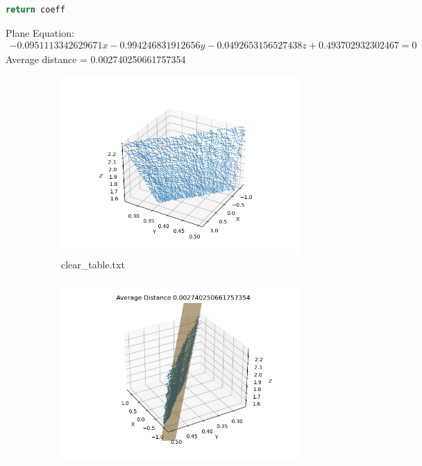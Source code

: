 \documentclass[conference,onecolumn]{IEEEtran}
\begin{document}
\begin{enumerate}[label=\arabic{enumi}.]
\begin{enumerate}
\begin{lstlisting}[language=Python]
      return coeff
                        \end{lstlisting}
                        Plane Equation:
                        \begin{align*}
                              -0.0951113342629671 x - 0.994246831912656 y - 0.0492653156527438 z + 0.493702932302467 = 0
                        \end{align*}
                        Average distance = 0.002740250661757354
                        \begin{figure}[H]
                              \centering
                              \begin{subfigure}{.49\linewidth}
                                    \includegraphics[width=.99\linewidth]{figs/Q4_clear_table_points.png}
                                    \caption{clear\_table.txt}
                              \end{subfigure}
                              \begin{subfigure}{.49\linewidth}
                                    \includegraphics[width=.99\linewidth]{figs/Q4_clear_table_plane.png}

\end{subfigure}
\end{figure}
\end{enumerate}
\end{enumerate}
\end{document}
